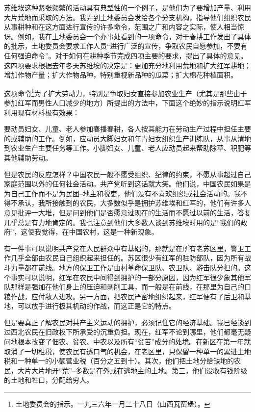 \documentclass[10pt]{book}
\begin{document}
苏维埃这种紧张频繁的活动具有典型性的一个例子，是他们为了要增加产量、利用大片荒地而采取的方法。我弄到土地委员会发给各个分支机构，指导他们组织农民从事耕种和在这方面进行宣传的许多命令，范围之广和内容之实际，使人相当惊讶。例如，我在土地委员会一个办事处看到的一项命令，对于春耕工作发出了具体的批示，土地委员会要求工作人员“进行广泛的宣传，争取农民自愿参加，不要有任何强迫命令”。对于如何在耕种季节完成四项主要的要求，提出了具体的意见。这四项要求根据去年冬天苏维埃的决定是：更加充分地利用荒地和扩大红军耕地；增加作物产量；扩大作物品种，特别重视新品种的瓜菜；扩大棉花种植面积。

这项命令\footnote{土地委员会的指示。一九三六年一月二十八日（山西瓦窑堡）。}为了扩大劳动力，特别是争取妇女直接参加农业生产（尤其是那些由于参加红军而男性人口减少的地方）所提出的方法中，下面这个绝妙的指示说明红军利用现有材料极有效果：

要动员妇女、儿童、老人参加春播春耕，各人按其能力在劳动生产过程中担任主要的或辅助的工作。倒如，应动员大脚妇女和年青妇女组织生产训练队，从事从清地到农业生产主要任务等工作。小脚妇女、儿童、老人应动员起来帮助除草、积肥等其他辅助劳动。

但是农民的反应怎样？中国农民一般不愿受组织、纪律的约束，不愿从事超过自己家庭范围以外的任何社会活动。共产党听到这话就大笑。他们说，中国农民如果是为自己工作而不是为民团--地主和税吏，他们没有不喜欢组织或社会活动的。我不得不承认，我所接触到的农民，大多数似乎是拥护苏维埃和红军的，他们有许多人意见批评一大堆，但是问到他们是否愿意过现在的生活而不愿过以前的生活，答复几乎总是有力地肯定的。我也注意到他们大多数人谈到苏维埃时用的是“我们的政府”，这使我觉得，在中国农村，这是一种新现象。

有一件事可以说明共产党在人民群众中有基础的，那就是在所有老苏区里，警卫工作几乎全部由农民自己组织起来担任的。苏区很少有红军的驻防部队，因为所有战斗力量都在前线。地方的保卫工作是由村革命保卫队、农卫队、游击队分担的。这个事实可以说明，红军在农民中间得到拥护的一部分原因，因为红军很少象其他军队那样是强加在他们身上的压迫和剥削工具，而一般是在前线，在那里为自己的口粮作战，应付敌人进攻。另一方面，把农民严密地组织起来，红军便有了后卫和基地，可以放手进行极其机动的作战，而这正是它的特点。

但是要真正了解农民对共产主义运动的拥护，必须记住它的经济基础。我已经谈到过西北农民在旧政权下所承受的沉重负担。现在，红军不论到哪里，他们都毫无疑问地根本改变了佃农、贫农、中农以及所有“贫苦”成分的处境。在新区在第一年就取消了一切租税，使农民有透口气的机会，在老区里，只保留一种单一的累进土地税和一种单一的小额营业税（百分之五到十）。其次，他们把土地分给缺地的农民，大片大片地开“荒”--多数是在外或在逃地主的土地。第三，他们没收有钱阶级的土地和牲口，分配给穷人。
\end{document}
